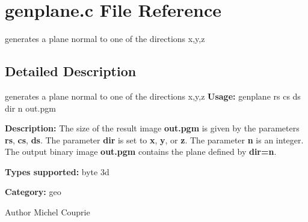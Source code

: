 \section{genplane.c File Reference}
\label{genplane_8c}


generates a plane normal to one of the directions x,y,z  




\subsection{Detailed Description}
generates a plane normal to one of the directions x,y,z {\bfseries Usage:} genplane rs cs ds dir n out.pgm

{\bfseries Description:} The size of the result image {\bfseries out.pgm} is given by the parameters {\bfseries rs}, {\bfseries cs}, {\bfseries ds}. The parameter {\bfseries dir} is set to {\bfseries x}, {\bfseries y}, or {\bfseries z}. The parameter {\bfseries n} is an integer. The output binary image {\bfseries out.pgm} contains the plane defined by {\bfseries dir=n}.

{\bfseries Types supported:} byte 3d

{\bfseries Category:} geo

\begin{DoxyAuthor}{Author}
Michel Couprie 
\end{DoxyAuthor}
